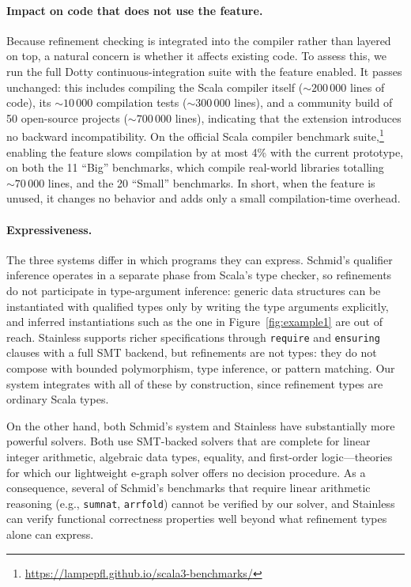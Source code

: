 \documentclass[acmsmall]{acmart}
\begin{document}
\paragraph{Impact on code that does not use the feature.}
Because refinement checking is integrated into the compiler rather than layered on top, a natural concern is whether it affects existing code. To assess this, we run the full Dotty continuous-integration suite with the feature enabled. It passes unchanged: this includes compiling the Scala compiler itself (${\sim}200\,000$ lines of code), its ${\sim}10\,000$ compilation tests (${\sim}300\,000$ lines), and a community build of 50 open-source projects (${\sim}700\,000$ lines), indicating that the extension introduces no backward incompatibility. On the official Scala compiler benchmark suite,\footnote{\url{https://lampepfl.github.io/scala3-benchmarks/}} enabling the feature slows compilation by at most 4\% with the current prototype, on both the 11 ``Big'' benchmarks, which compile real-world libraries totalling ${\sim}70\,000$ lines, and the 20 ``Small'' benchmarks. In short, when the feature is unused, it changes no behavior and adds only a small compilation-time overhead.



\paragraph{Expressiveness.}
The three systems differ in which programs they can express. Schmid's qualifier inference operates in a separate phase from Scala's type checker, so refinements do not participate in type-argument inference: generic data structures can be instantiated with qualified types only by writing the type arguments explicitly, and inferred instantiations such as the one in Figure~\ref{fig:example1} are out of reach. Stainless supports richer specifications through \lstinline!require! and \lstinline!ensuring! clauses with a full SMT backend, but refinements are not types: they do not compose with bounded polymorphism, type inference, or pattern matching. Our system integrates with all of these by construction, since refinement types are ordinary Scala types.

On the other hand, both Schmid's system and Stainless have substantially more powerful solvers. Both use SMT-backed solvers that are complete for linear integer arithmetic, algebraic data types, equality, and first-order logic---theories for which our lightweight e-graph solver offers no decision procedure. As a consequence, several of Schmid's benchmarks that require linear arithmetic reasoning (e.g., \texttt{sumnat}, \texttt{arrfold}) cannot be verified by our solver, and Stainless can verify functional correctness properties well beyond what refinement types alone can express.
\end{document}
